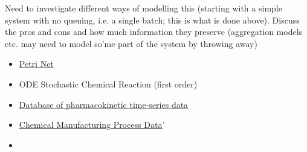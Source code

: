 \documentclass[../Thesis.tex]{subfiles}
\begin{document}
Need to investigate different ways of modelling this (starting with a simple system with no queuing, i.e. a single batch; this is what is done above). Discuss the pros and cons and how much information they preserve (aggregation models etc. may need to model so'me part of the system by throwing away)


\begin{itemize}
    \item \href{https://en.wikipedia.org/wiki/Petri_net}{Petri Net}
    \item ODE Stochastic Chemical Reaction (first order)
    \item \href{https://www.nature.com/articles/s41597-020-0455-1}{Database of pharmacokinetic time-series data}
    \item \href{https://search.r-project.org/CRAN/refmans/AppliedPredictiveModeling/html/ChemicalManufacturingProcess.html}{Chemical Manufacturing Process Data}'
    \item \cite[sample reference]{TuringAward07}
\end{itemize}
\end{document}
